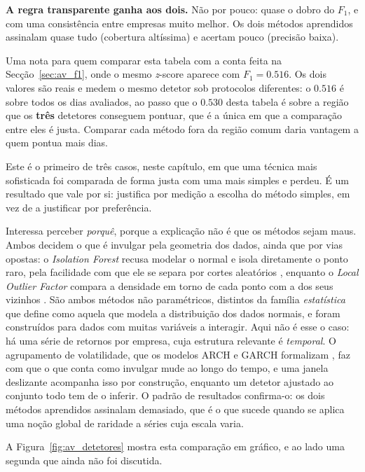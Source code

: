 \textbf{A regra transparente ganha aos dois.} Não por pouco: quase o dobro do $F_1$, e com uma
consistência entre empresas muito melhor. Os dois métodos aprendidos assinalam quase tudo
(cobertura altíssima) e acertam pouco (precisão baixa).

Uma nota para quem comparar esta tabela com a conta feita na Secção~\ref{sec:av_f1}, onde o mesmo
\emph{z}-score aparece com $F_1 = 0.516$. Os dois valores são reais e medem o mesmo detetor sob
protocolos diferentes: o $0.516$ é sobre todos os dias avaliados, ao passo que o $0.530$ desta tabela
é sobre a região que os \textbf{três} detetores conseguem pontuar, que é a única em que a comparação
entre eles é justa. Comparar cada método fora da região comum daria vantagem a quem pontua mais
dias.

Este é o primeiro de três casos, neste capítulo, em que uma técnica mais sofisticada foi comparada
de forma justa com uma mais simples e perdeu. É um resultado que vale por si: justifica por medição
a escolha do método simples, em vez de a justificar por preferência.

Interessa perceber \emph{porquê}, porque a explicação não é que os métodos sejam maus. Ambos
decidem o que é invulgar pela geometria dos dados, ainda que por vias opostas: o \emph{Isolation
Forest} recusa modelar o normal e isola diretamente o ponto raro, pela facilidade com que ele se
separa por cortes aleatórios \autocite{liu2008isolation}, enquanto o \emph{Local Outlier Factor}
compara a densidade em torno de cada ponto com a dos seus vizinhos \autocite{breunig2000lof}. São ambos
métodos não paramétricos, distintos da família \emph{estatística} que \textcite{chandola2009anomaly}
define como aquela que modela a distribuição dos dados normais, e foram construídos para dados com
muitas variáveis a interagir. Aqui não é esse o caso: há uma série
de retornos por empresa, cuja estrutura relevante é \emph{temporal}. O agrupamento de volatilidade, que os modelos \gls{ARCH} e \gls{GARCH} formalizam
\autocite{engle1982arch, bollerslev1986garch}, faz com que o que conta como invulgar mude ao longo
do tempo, e uma janela deslizante acompanha isso por
construção, enquanto um detetor ajustado ao conjunto todo tem de o inferir. O padrão de resultados
confirma-o: os dois métodos aprendidos assinalam demasiado, que é o que sucede quando se aplica uma
noção global de raridade a séries cuja escala varia.

A Figura~\ref{fig:av_detetores} mostra esta comparação em gráfico, e ao lado uma segunda que ainda
não foi discutida.

